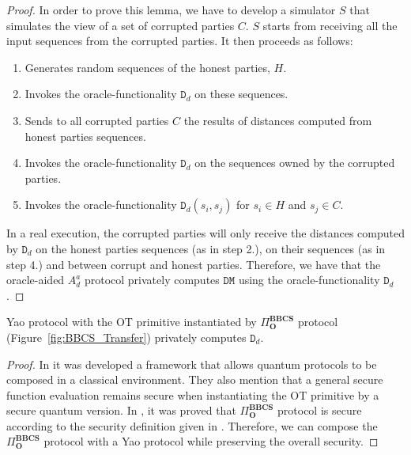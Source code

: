 \begin{proof}
In order to prove this lemma, we have to develop a simulator $S$ that simulates the view of a set of corrupted parties $C$. $S$ starts from receiving all the input sequences from the corrupted parties. It then proceeds as follows:

\begin{enumerate}
    \item Generates random sequences of the honest parties, $H$.
    \item Invokes the oracle-functionality $\mathtt{D}_d$ on these sequences.
    \item Sends to all corrupted parties $C$ the results of distances computed from honest parties sequences.
    \item Invokes the oracle-functionality $\mathtt{D}_d$ on the sequences owned by the corrupted parties.
    \item Invokes the oracle-functionality $\mathtt{D}_d(s_i, s_j)$ for $s_i\in H$ and $s_j\in C$. 
\end{enumerate}

In a real execution, the corrupted parties will only receive the distances computed by $\mathtt{D}_d$ on the honest parties sequences (as in step 2.), on their sequences (as in step 4.) and between corrupt and honest parties. Therefore, we have that the oracle-aided $A^a_d$ protocol privately computes $\mathtt{DM}$ using the oracle-functionality $\mathtt{D}_d$.

\end{proof}

\begin{lemma}\label{secondlemma}
Yao protocol with the OT primitive instantiated by $\Pi^{\textbf{BBCS}}_{\textbf{O}}$ protocol (Figure~\ref{fig:BBCS_Transfer}) privately computes $\mathtt{D}_d$.
\end{lemma}

\begin{proof}

In \cite{FS09} it was developed a framework that allows quantum protocols to be composed in a classical environment. They also mention that a general secure function evaluation remains secure when instantiating the OT primitive by a secure quantum version. In \cite{DFL+09}, it was proved that $\Pi^{\textbf{BBCS}}_{\textbf{O}}$ protocol is secure according to the security definition given in \cite{FS09}. Therefore, we can compose the $\Pi^{\textbf{BBCS}}_{\textbf{O}}$ protocol with a Yao protocol \cite{Lindell2008} while preserving the overall security. 

\end{proof}


